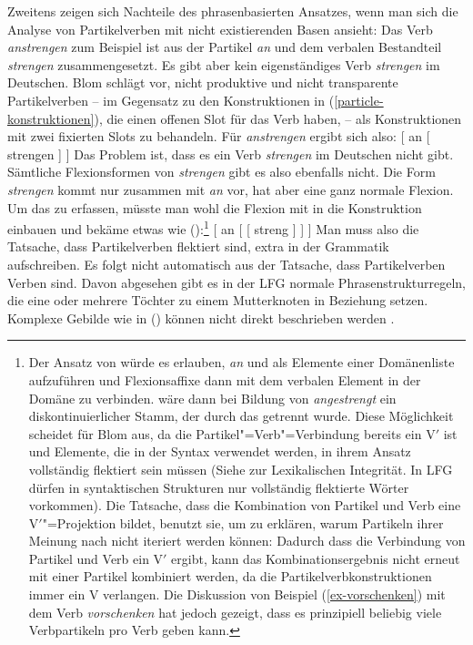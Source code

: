 Zweitens zeigen sich Nachteile des phrasenbasierten Ansatzes, wenn man sich
die Analyse von Partikelverben mit nicht existierenden Basen ansieht:
Das Verb \emph{anstrengen} zum Beispiel ist aus der Partikel \emph{an}
und dem verbalen Bestandteil \emph{strengen} zusammengesetzt. Es gibt
aber kein eigenständiges Verb \emph{strengen} im Deutschen. Blom
schlägt vor, nicht produktive und nicht transparente Partikelverben
-- im Gegensatz zu den Konstruktionen in (\ref{particle-konstruktionen}),
die einen offenen Slot für das Verb haben, -- als Konstruktionen mit zwei
fixierten Slots zu behandeln. Für \emph{anstrengen} ergibt sich also:
\ea 
{}[ an   [ strengen ] ]
\z
Das Problem ist, dass es ein Verb \emph{strengen} im Deutschen nicht gibt.
Sämtliche Flexionsformen von \emph{strengen} gibt es also ebenfalls nicht.
Die Form \emph{strengen} kommt nur zusammen mit \emph{an} vor, hat aber eine
ganz normale Flexion. Um das zu erfassen, müsste man wohl die Flexion mit in
die Konstruktion einbauen und bekäme etwas wie ():\footnote{
  Der Ansatz von \citet{Crysmann2002a} würde es erlauben, \emph{an} und
   als Elemente einer Domänenliste aufzuführen und Flexionsaffixe
  dann mit dem verbalen Element in der Domäne zu verbinden. 
  wäre dann bei Bildung von \emph{angestrengt} ein diskontinuierlicher
  Stamm, der durch das  getrennt wurde. Diese Möglichkeit scheidet
  für Blom aus, da die Partikel"=Verb"=Verbindung bereits ein V$'$ ist
  und Elemente, die in der Syntax verwendet werden, in ihrem Ansatz
  vollständig flektiert sein müssen (Siehe  zur Lexikalischen
  Integrität. In LFG dürfen in syntaktischen Strukturen nur vollständig flektierte Wörter vorkommen). 
  Die Tatsache, dass die Kombination von Partikel und Verb eine V$'$"=Projektion bildet, benutzt sie, um zu
  erklären, warum Partikeln ihrer Meinung nach nicht iteriert werden können: Dadurch dass
  die Verbindung von Partikel und Verb ein V$'$ ergibt, kann das Kombinationsergebnis
  nicht erneut mit einer Partikel kombiniert werden, da die Partikelverbkonstruktionen
  immer ein V verlangen. Die Diskussion von Beispiel (\ref{ex-vorschenken}) mit dem Verb \emph{vorschenken} hat jedoch gezeigt, dass es prinzipiell beliebig
  viele Verbpartikeln pro Verb geben kann.%
}
\ea 
{}[ an   [ [ streng ] ] ]
\z
Man muss also die Tatsache, dass Partikelverben flektiert sind, extra in der Grammatik
aufschreiben. Es folgt nicht automatisch aus der Tatsache, dass Partikelverben Verben sind. Davon
abgesehen gibt es in der LFG normale Phrasenstrukturregeln, die eine oder mehrere Töchter zu einem
Mutterknoten in Beziehung setzen. Komplexe Gebilde wie in () können nicht direkt beschrieben
werden \citep[75]{Belyaev2023a-u}.

